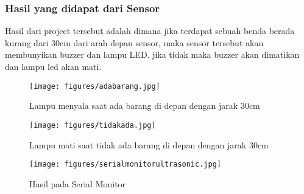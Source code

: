 \subsubsection{Hasil yang didapat dari Sensor}
Hasil dari project tersebut adalah dimana jika terdapat sebuah benda berada kurang dari 30cm dari arah depan sensor, maka sensor tersebut akan membunyikan buzzer dan lampu LED. jika tidak maka buzzer akan dimatikan dan lampu led akan mati.
\begin{figure}[ht]
\centerline{\texttt{[image: figures/adabarang.jpg]}}
\caption{Lampu menyala saat ada barang di depan dengan jarak 30cm}
\label{lampunyala}
\end{figure}
\begin{figure}[ht]
\centerline{\texttt{[image: figures/tidakada.jpg]}}
\caption{Lampu mati saat tidak ada barang di depan dengan jarak 30cm}
\label{lampumati}
\end{figure}
\begin{figure}[ht]
\centerline{\texttt{[image: figures/serialmonitorultrasonic.jpg]}}
\caption{Hasil pada Serial Monitor}
\label{serialmonitor}
\end{figure}